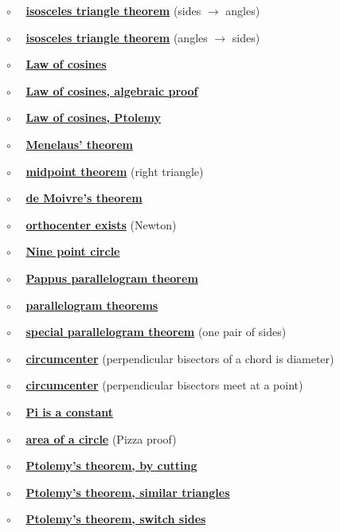 \documentclass[11pt, oneside]{article}
\begin{document}
$\circ$ \ \  \hyperref[sec:isosceles_triangle_theorem]{\textbf{isosceles triangle theorem}} (sides $\rightarrow$ angles)

$\circ$ \ \  \hyperref[sec:isosceles_converse]{\textbf{isosceles triangle theorem}} (angles $\rightarrow$ sides)

$\circ$ \ \ \hyperref[sec:law_of_cosines]{\textbf{Law of cosines}}

$\circ$ \ \ \hyperref[sec:law_of_cosines_algebraic]{\textbf{Law of cosines, algebraic proof}}

$\circ$ \ \ \hyperref[sec:LOC_by_Ptolemy]{\textbf{Law of cosines, Ptolemy}}

$\circ$ \ \ \hyperref[sec:Menelaus_theorem]{\textbf{Menelaus' theorem}}

$\circ$ \ \ \hyperref[sec:right_triangle_midpoint_theorem]{\textbf{midpoint theorem}} (right triangle)

$\circ$ \ \ \hyperref[sec:de_Moivre_theorem]{\textbf{de Moivre's theorem}}

$\circ$ \ \ \hyperref[sec:Newton_altitude]{\textbf{orthocenter exists}}  (Newton)

$\circ$ \ \ \hyperref[sec:nine_point_circle]{\textbf{Nine point circle}}

$\circ$ \ \ \hyperref[sec:PProof_Pappus]{\textbf{Pappus parallelogram theorem}}

$\circ$ \ \ \hyperref[sec:parallelogram_theorems]{\textbf{parallelogram theorems}}

$\circ$ \ \ \hyperref[sec:one_pair_of_sides]{\textbf{special parallelogram theorem}} (one pair of sides)

$\circ$ \ \ \hyperref[sec:perpendicular_bisector_of_a_chord]{\textbf{circumcenter}} (perpendicular bisectors of a chord is diameter)

$\circ$ \ \ \hyperref[sec:circumcenter]{\textbf{circumcenter}} (perpendicular bisectors meet at a point)

$\circ$ \ \ \hyperref[sec:Pi_is_a_constant]{\textbf{Pi is a constant}}

$\circ$ \ \ \hyperref[sec:pizza_proof]{\textbf{area of a circle}} (Pizza proof)

$\circ$ \ \ \hyperref[sec:Ptolemy]{\textbf{Ptolemy's theorem, by cutting}}

$\circ$ \ \ \hyperref[sec:Ptolemy_similar_triangles]{\textbf{Ptolemy's theorem, similar triangles}}

$\circ$ \ \ \hyperref[sec:Ptolemy_switch_sides]{\textbf{Ptolemy's theorem, switch sides}}
\end{document}
